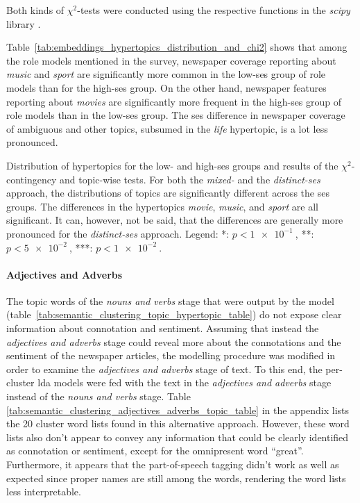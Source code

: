 Both kinds of $\chi^2$-tests were conducted using the respective functions in the \textit{scipy} library \autocite{scipychi2_scipy_nodate,scipychi2_contingency_scipy_nodate}.

Table~\ref{tab:embeddings_hypertopics_distribution_and_chi2} shows that among the role models mentioned in the survey, newspaper coverage reporting about \textit{music} and \textit{sport} are significantly more common in the low-\gls{ses} group of role models than for the high-\gls{ses} group. On the other hand, newspaper features reporting about \textit{movies} are significantly more frequent in the high-\gls{ses} group of role models than in the low-\gls{ses} group. The \gls{ses} difference in newspaper coverage of ambiguous and other topics, subsumed in the \textit{life} hypertopic, is a lot less pronounced.

\begin{table}
    \centering
    
    \caption{Distribution of hypertopics for the low- and high-\gls{ses} groups and results of the $\chi^2$-contingency and topic-wise tests. For both the \textit{mixed-} and the \textit{distinct-\gls{ses}} approach, the distributions of topics are significantly different across the \gls{ses} groups. The differences in the hypertopics \textit{movie}, \textit{music}, and \textit{sport} are all significant. It can, however, not be said, that the differences are generally more pronounced for the \textit{distinct-\gls{ses}} approach. Legend: *: $p < \SI{1e-1}{}$, **: $p<\SI{5e-2}{}$, ***: $p<\SI{1e-2}{}$.}\label{tab:embeddings_hypertopics_distribution_and_chi2}
\end{table}

\paragraph{Adjectives and Adverbs}
The topic words of the \textit{nouns and verbs} stage that were output by the model (table~\ref{tab:semantic_clustering_topic_hypertopic_table}) do not expose clear information about connotation and sentiment. Assuming that instead the \textit{adjectives and adverbs} stage could reveal more about the connotations and the sentiment of the newspaper articles, the modelling procedure was modified in order to examine the \textit{adjectives and adverbs} stage of text. To this end, the per-cluster \gls{lda} models were fed with the text in the \textit{adjectives and adverbs} stage instead of the \textit{nouns and verbs} stage. Table \ref{tab:semantic_clustering_adjectives_adverbs_topic_table} in the appendix lists the \SI{20}{} cluster word lists found in this alternative approach. However, these word lists also don't appear to convey any information that could be clearly identified as connotation or sentiment, except for the omnipresent word ``great''. Furthermore, it appears that the part-of-speech tagging didn't work as well as expected since proper names are still among the words, rendering the word lists less interpretable.



